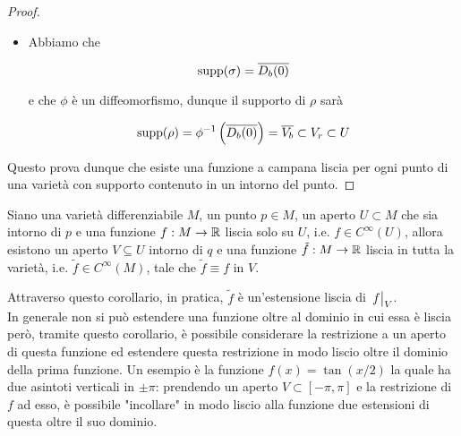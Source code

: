 \begin{proof}
\begin{itemize}
		\item Abbiamo che
		
		\begin{equation}
			\operatorname{supp}(\sigma) = \overline{D_{b}(0)}
		\end{equation}
	
		e che $ \phi $ è un diffeomorfismo, dunque il supporto di $ \rho $ sarà
		
		\begin{equation}
			\supp(\rho) = \phi^{-1} \left( \overline{D_{b}(0)} \right) %
			= \overline{V_{b}} \subset V_{r} \subset U
		\end{equation}
	\end{itemize}
	
	Questo prova dunque che esiste una funzione a campana liscia per ogni punto di una varietà con supporto contenuto in un intorno del punto.
\end{proof}

\begin{corollary}\label{cor-est-smooth}
	Siano una varietà differenziabile $ M $, un punto $ p \in M $, un aperto $ U \subset M $ che sia intorno di $ p $ e una funzione $ f : M \to \mathbb{R} $ liscia solo su $ U $, i.e. $ f \in C^{\infty}(U) $, allora esistono un aperto $ V \subseteq U $ intorno di $ q $ e una funzione $ \tilde{f} : M \to \mathbb{R} $ liscia in tutta la varietà, i.e. $ \tilde{f} \in C^{\infty}(M) $, tale che $ \tilde{f} \equiv f $ in $ V $.
\end{corollary}

Attraverso questo corollario, in pratica, $ \tilde{f} $ è un'estensione liscia di $ \eval{f}_{V} $.\\
In generale non si può estendere una funzione oltre al dominio in cui essa è liscia però, tramite questo corollario, è possibile considerare la restrizione a un aperto di questa funzione ed estendere questa restrizione in modo liscio oltre il dominio della prima funzione. Un esempio è la funzione $ f(x) = \tan(x/2) $ la quale ha due asintoti verticali in $ \pm \pi $: prendendo un aperto $ V \subset [-\pi,\pi] $ e la restrizione di $ f $ ad esso, è possibile "incollare" in modo liscio alla funzione due estensioni di questa oltre il suo dominio.

